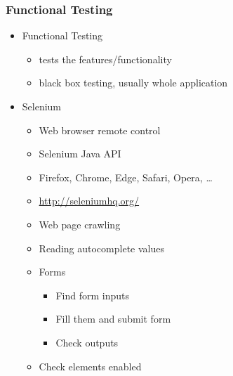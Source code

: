 \documentclass[10pt,xcolor=pdflatex]{beamer}
\begin{document}
\begin{frame}\frametitle{Functional Testing}
\begin{itemize}
  \item Functional Testing
      \begin{itemize}
        \item tests the features/functionality 
        \item black box testing, usually whole application
      \end{itemize}
  \item Selenium
	\begin{itemize}
		\item Web browser remote control
		\item Selenium Java API
		\item Firefox, Chrome, Edge, Safari, Opera, \ldots
		\item \url{http://seleniumhq.org/}
		\item Web page crawling
		\item Reading autocomplete values
        \item Forms
          \begin{itemize}
            \item Find form inputs
	        \item Fill them and submit form
            \item Check outputs
          \end{itemize}
    	\item Check elements enabled
    \end{itemize}
\end{itemize}
\end{frame}
\end{document}
